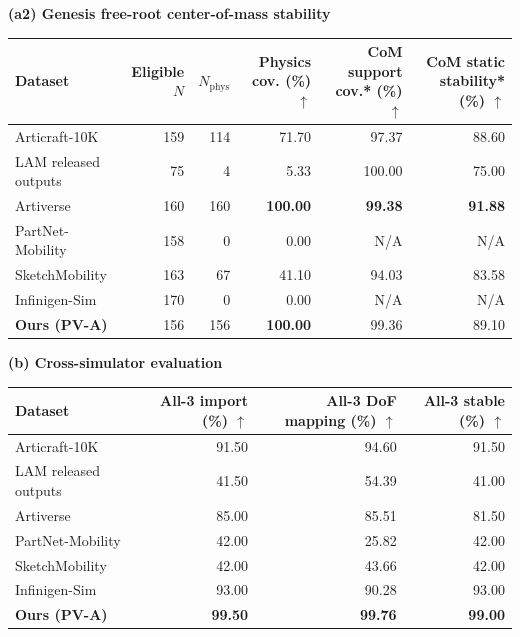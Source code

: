 \begin{table}[t]
  \vspace{5pt}
  \textbf{(a2) Genesis free-root center-of-mass stability}

  \begingroup
  \small
  \setlength{\tabcolsep}{7pt}
  \renewcommand{\arraystretch}{1.08}
  \begin{tabular}{@{}lrrrrr@{}}
    \toprule
    Dataset & Eligible $N$ & $N_{\mathrm{phys}}$ &
    \shortstack{Physics cov.\\(\%) $\uparrow$} &
    \shortstack{CoM support cov.*\\(\%) $\uparrow$} &
    \shortstack{CoM static stability*\\(\%) $\uparrow$} \\
    \midrule
    Articraft-10K        & 159 & 114 & 71.70          & 97.37          & 88.60 \\
    LAM released outputs & 75  & 4   & 5.33           & 100.00         & 75.00 \\
    Artiverse            & 160 & 160 & \textbf{100.00} & \textbf{99.38} & \textbf{91.88} \\
    PartNet-Mobility     & 158 & 0   & 0.00           & N/A            & N/A \\
    SketchMobility       & 163 & 67  & 41.10          & 94.03          & 83.58 \\
    Infinigen-Sim        & 170 & 0   & 0.00           & N/A            & N/A \\
    \textbf{Ours (PV-A)}  & 156 & 156 & \textbf{100.00} & 99.36          & 89.10 \\
    \bottomrule
  \end{tabular}
  \endgroup

  \vspace{5pt}
  \textbf{(b) Cross-simulator evaluation}

  \begingroup
  \small
  \setlength{\tabcolsep}{9pt}
  \renewcommand{\arraystretch}{1.08}
  \begin{tabular}{@{}lrrr@{}}
    \toprule
    Dataset &
    \shortstack{All-3 import\\(\%) $\uparrow$} &
    \shortstack{All-3 DoF mapping\\(\%) $\uparrow$} &
    \shortstack{All-3 stable\\(\%) $\uparrow$} \\
    \midrule
    Articraft-10K        & 91.50          & 94.60          & 91.50 \\
    LAM released outputs & 41.50          & 54.39          & 41.00 \\
    Artiverse            & 85.00          & 85.51          & 81.50 \\
    PartNet-Mobility     & 42.00          & 25.82          & 42.00 \\
    SketchMobility       & 42.00          & 43.66          & 42.00 \\
    Infinigen-Sim        & 93.00          & 90.28          & 93.00 \\
    \textbf{Ours (PV-A)}  & \textbf{99.50} & \textbf{99.76} & \textbf{99.00} \\
    \bottomrule
  \end{tabular}
  \endgroup


\end{table}
